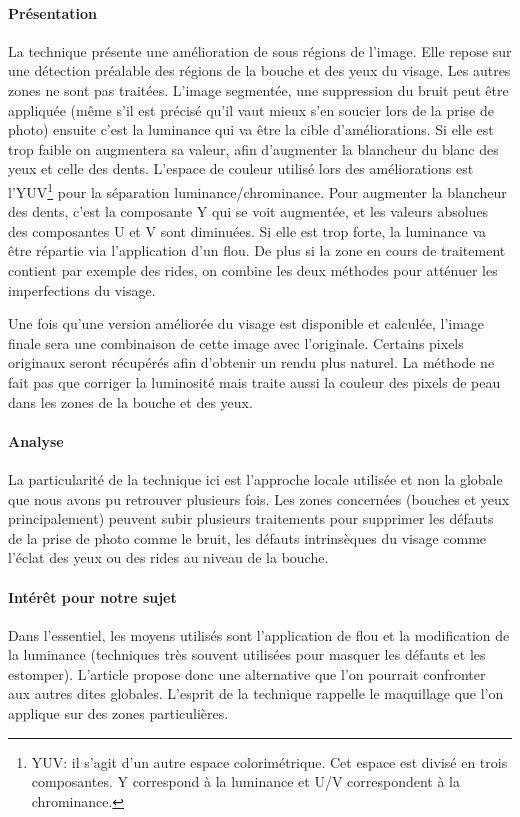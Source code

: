 \documentclass[11pt, french,screen]{report-rd-info}
\begin{document}
\paragraph{Présentation}
La technique présente une amélioration de sous régions de l’image.  Elle repose sur une détection préalable des régions de la bouche et des yeux du visage. Les autres zones ne sont pas traitées.
L’image segmentée, une suppression du bruit peut être appliquée (même s’il est précisé qu’il vaut mieux s’en soucier lors de la prise de photo) ensuite c’est la luminance qui va être la cible d’améliorations. Si elle est trop faible on augmentera sa valeur, afin d’augmenter la blancheur du blanc des yeux et celle des dents. L’espace de couleur utilisé lors des améliorations est l’YUV\footnote{YUV: il s'agit d'un autre espace colorimétrique. Cet espace est divisé en trois composantes. Y correspond à la luminance et U/V correspondent à la chrominance.} pour la séparation luminance/chrominance. Pour augmenter la blancheur des dents, c’est la composante Y qui se voit augmentée, et les valeurs absolues des composantes U et V sont diminuées.
Si elle est trop forte, la luminance va être répartie via l’application d’un flou. De plus si la zone en cours de traitement contient par exemple des rides, on combine les deux méthodes pour atténuer les imperfections du visage.

Une fois qu’une version améliorée du visage est disponible et calculée, l’image finale sera une combinaison de cette image avec l’originale. Certains pixels originaux seront récupérés afin d’obtenir un rendu plus naturel.
La méthode ne fait pas que corriger la luminosité mais traite aussi la couleur des pixels de peau dans les zones de la bouche et des yeux.
\paragraph{Analyse}
La particularité de la technique ici est l’approche locale utilisée et non la globale que nous avons pu retrouver plusieurs fois. Les zones concernées (bouches et yeux principalement) peuvent subir plusieurs traitements pour supprimer les défauts de la prise de photo comme le bruit, les défauts intrinsèques du visage comme l’éclat des yeux ou des rides au niveau de la bouche.
\paragraph{Intérêt pour notre sujet}
Dans l’essentiel, les moyens utilisés sont l’application de flou et la modification de la luminance (techniques très souvent utilisées pour masquer les défauts et les estomper). L’article propose donc une alternative que l’on pourrait confronter aux autres dites globales. L’esprit de la technique rappelle le maquillage que l’on applique sur des zones particulières.
\end{document}
